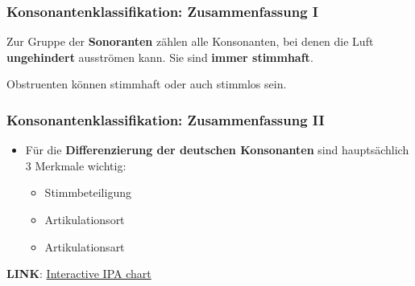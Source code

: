 \begin{frame}
	\frametitle{Konsonantenklassifikation: Zusammenfassung I}
	
\begin{figure}
	\centering
	

\end{figure}

Zur Gruppe der \textbf{Sonoranten} zählen alle Konsonanten, bei denen die Luft \textbf{ungehindert} ausströmen kann. Sie sind \textbf{immer stimmhaft}.

Obstruenten können stimmhaft oder auch stimmlos sein.
	
\end{frame}


\begin{frame}
	\frametitle{Konsonantenklassifikation: Zusammenfassung II}

	\begin{itemize}
		\item Für die \textbf{Differenzierung der deutschen Konsonanten} sind hauptsächlich 3 Merkmale wichtig:
		
		\begin{itemize}
			
			\item Stimmbeteiligung
			\item Artikulationsort
			\item Artikulationsart
		\end{itemize}
	\end{itemize}

\textbf{LINK}: \href{http://www.ipachart.com/}{Interactive IPA chart}

\end{frame}


